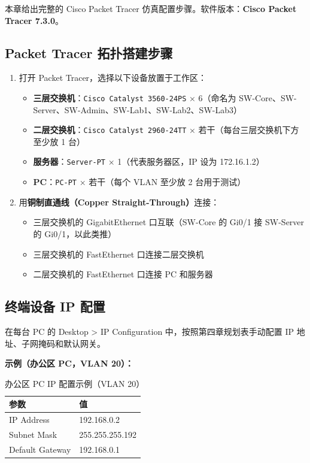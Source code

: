 \documentclass[12pt,a4paper]{ctexart}
\begin{document}
本章给出完整的 Cisco Packet Tracer 仿真配置步骤。软件版本：\textbf{Cisco Packet Tracer 7.3.0}。

\subsection{Packet Tracer 拓扑搭建步骤}

\begin{enumerate}
  \item 打开 Packet Tracer，选择以下设备放置于工作区：
    \begin{itemize}
      \item \textbf{三层交换机}：\texttt{Cisco Catalyst 3560-24PS} × 6（命名为 SW-Core、SW-Server、SW-Admin、SW-Lab1、SW-Lab2、SW-Lab3）
      \item \textbf{二层交换机}：\texttt{Cisco Catalyst 2960-24TT} × 若干（每台三层交换机下方至少放 1 台）
      \item \textbf{服务器}：\texttt{Server-PT} × 1（代表服务器区，IP 设为 172.16.1.2）
      \item \textbf{PC}：\texttt{PC-PT} × 若干（每个 VLAN 至少放 2 台用于测试）
    \end{itemize}
  \item 用\textbf{铜制直通线（Copper Straight-Through）}连接：
    \begin{itemize}
      \item 三层交换机的 GigabitEthernet 口互联（SW-Core 的 Gi0/1 接 SW-Server 的 Gi0/1，以此类推）
      \item 三层交换机的 FastEthernet 口连接二层交换机
      \item 二层交换机的 FastEthernet 口连接 PC 和服务器
    \end{itemize}
\end{enumerate}

\subsection{终端设备 IP 配置}

在每台 PC 的 Desktop > IP Configuration 中，按照第四章规划表手动配置 IP 地址、子网掩码和默认网关。

\textbf{示例（办公区 PC，VLAN 20）：}

\begin{table}[H]
\centering
\caption{办公区 PC IP 配置示例（VLAN 20）}
\begin{tabular}{ll}
\toprule
\textbf{参数} & \textbf{值} \\
\midrule
IP Address     & 192.168.0.2 \\
Subnet Mask    & 255.255.255.192 \\
Default Gateway& 192.168.0.1 \\
\bottomrule
\end{tabular}
\end{table}
\end{document}
